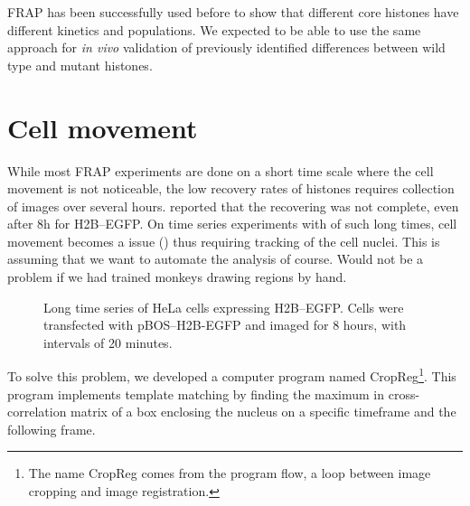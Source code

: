   FRAP has been successfully used before to show that different core histones have
  different kinetics and populations. We expected to be able to use the same approach
  for \textit{in vivo} validation of previously identified differences between
  wild type and mutant histones.




\section{Cell movement}

  While most FRAP experiments are done on a short time scale where the cell movement
  is not noticeable, the low recovery rates of histones requires collection of images
  over several hours.  reported that the recovering was not
  complete, even after 8h for H2B--EGFP.  On time series experiments with of such long
  times, cell movement becomes a issue () thus requiring tracking
  of the cell nuclei. This is assuming that we want to automate the analysis of course.
  Would not be a problem if we had trained monkeys drawing regions by hand.

  \begin{figure}
    \centering
    \caption[Long time series of HeLa cells expressing H2B--EGFP.]
            {Long time series of HeLa cells expressing H2B--EGFP. Cells were transfected
            with pBOS--H2B-EGFP and imaged for 8 hours, with intervals of 20 minutes.}
    \label{fig:cell-movement}
  \end{figure}
  
  To solve this problem, we developed a computer program named CropReg\footnote{The name CropReg
  comes from the program flow, a loop between image cropping and image registration.}. This
  program implements template matching by finding the maximum in cross-correlation matrix of a
  box enclosing the nucleus on a specific timeframe and the following frame.

